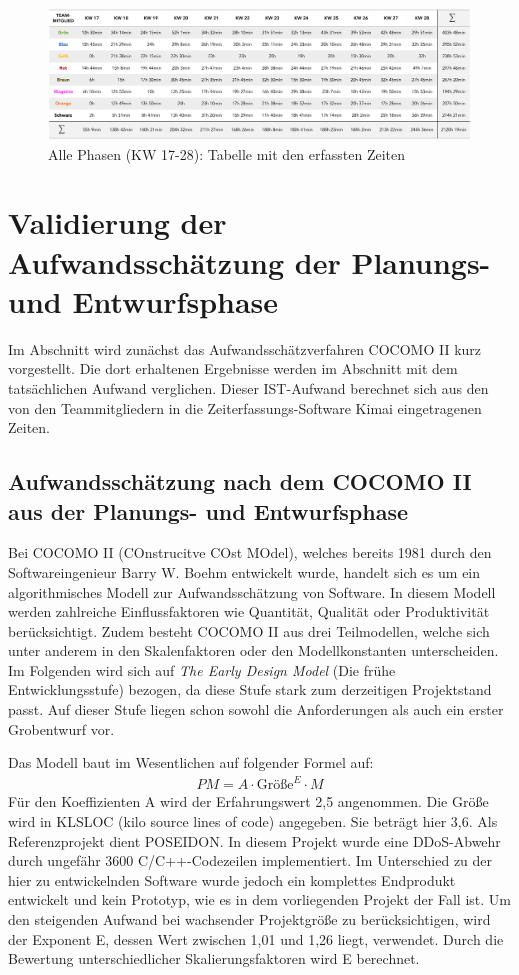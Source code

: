 \documentclass[../review_3.tex]{subfiles}
\begin{document}
\begin{figure} [h]
    \centering
    \includegraphics[angle=270, width = 0.42\linewidth]{img/tabelle2.png}
    \caption{Alle Phasen (KW 17-28): Tabelle mit den erfassten Zeiten}
    \label{kimai22}
\end{figure}

\section{Validierung der Aufwandsschätzung der Planungs- und Entwurfsphase}
Im Abschnitt \glqq {}\grqq{} wird zunächst das Aufwandsschätzverfahren COCOMO II  kurz vorgestellt. Die dort erhaltenen Ergebnisse werden im Abschnitt  \glqq {}\grqq{} mit dem tatsächlichen Aufwand verglichen. Dieser IST-Aufwand berechnet sich aus den von den Teammitgliedern in die Zeiterfassungs-Software Kimai eingetragenen Zeiten.

\subsection{Aufwandsschätzung nach dem COCOMO II aus der Planungs- und Entwurfsphase} \label{kap1}
Bei COCOMO II (COnstrucitve COst MOdel), welches bereits 1981 durch den Softwareingenieur Barry W. Boehm entwickelt wurde, handelt sich es um ein algorithmisches Modell zur Aufwandsschätzung von Software. In diesem Modell werden zahlreiche Einflussfaktoren wie Quantität, Qualität oder Produktivität berücksichtigt. Zudem besteht COCOMO II aus drei Teilmodellen, welche sich unter anderem in den Skalenfaktoren oder den Modellkonstanten unterscheiden. Im Folgenden wird sich auf \textit{\glqq The Early Design Model\grqq{}} (Die frühe Entwicklungsstufe) bezogen, da diese Stufe stark zum derzeitigen Projektstand passt. Auf dieser Stufe liegen schon sowohl die Anforderungen als auch ein erster Grobentwurf vor.

Das Modell baut im Wesentlichen auf folgender Formel auf:
\begin{align}
    PM = A \cdot \text{Größe}^E \cdot M
    \label{formel1}
\end{align}
Für den Koeffizienten A wird der Erfahrungswert 2,5 angenommen.
Die Größe wird in KLSLOC (kilo source lines of code) angegeben. Sie beträgt hier 3,6. Als Referenzprojekt dient POSEIDON\cite{testFab}.
In diesem Projekt wurde eine DDoS-Abwehr durch ungefähr 3600 C/C++-Codezeilen implementiert. Im Unterschied zu der hier zu entwickelnden Software wurde jedoch ein komplettes Endprodukt entwickelt und kein Prototyp, wie es in dem vorliegenden Projekt der Fall ist.
Um den steigenden Aufwand bei wachsender Projektgröße zu berücksichtigen, wird der Exponent E, dessen Wert zwischen 1,01 und 1,26 liegt, verwendet. Durch die Bewertung unterschiedlicher Skalierungsfaktoren wird E berechnet.
\end{document}
